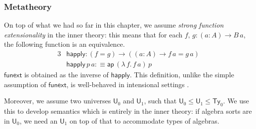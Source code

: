 \documentclass[12pt,a4paper,twoside,openany]{book}
\theoremstyle{remark}
\theoremstyle{definition}
\theoremstyle{theorem}
\newcommand{\ms}[1]{\mathsf{#1}}
\newcommand{\ap}{\ms{ap}}
\newcommand{\Ty}{\mathsf{Ty}}
\newcommand{\U}{\mathsf{U}}
\newcommand{\defn}{:\equiv}
\begin{document}
\subsubsection{Metatheory}

On top of what we had so far in this chapter, we assume \emph{strong function
extensionality} in the inner theory: this means that for each $f,\,g : (a : A)
\to B\,a$, the following function is an equivalence.
\begin{alignat*}{3}
  &\ms{happly} : (f = g) \to ((a : A) \to f\,a = g\,a)\\
  &\ms{happly}\,p\,a \defn \ap\,(\lambda\,f.\,f\,a)\,p
\end{alignat*}
$\ms{funext}$ is obtained as the inverse of $\ms{happly}$. This definition,
unlike the simple assumption of $\ms{funext}$, is well-behaved in intensional
settings \cite[Section~2.9]{hottbook}.

Moreover, we assume two universes $\U_0$ and $\U_1$, such that $\U_0 \leq \U_1
\leq \Ty_0$. We use this to develop semantics which is entirely in the inner
theory: if algebra sorts are in $\U_0$, we need an $\U_1$ on top of that to
accommodate types of algebras.

\end{document}
